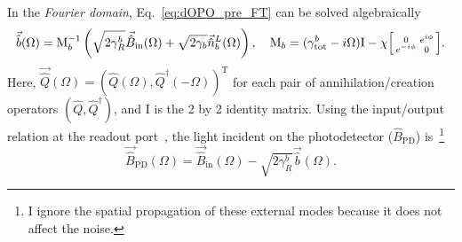 In the \emph{Fourier domain}, Eq.~\ref{eq:dOPO_pre_FT} can be solved algebraically~\cite{PhysRevA.30.1386} %
\begin{equation}
\label{eq:dOPO_FT_vectorised}
\vec{\hat b}(\Omega)=\text{M}_b^{-1}\left(\sqrt{2\gamma^b_R}\vec{\hat{B}}_\mathrm{in}(\Omega) + \sqrt{2\gamma_b}\vec{\hat{n}}^L_b(\Omega)\right),\quad\text{M}_b=(\gamma^b_\mathrm{tot}-i \Omega)\text{I}-\chi \begin{bsmallmatrix}0 & e^{i\phi} \\e^{-i\phi} & 0\end{bsmallmatrix}.
\end{equation}
Here, $\vec{\hat{Q}}(\Omega)=(\hat{Q}(\Omega),\hat{Q}^\dag(-\Omega))^\text{T}$ for each pair of annihilation/creation operators $(\hat Q, \hat Q^\dag)$, and $\text{I}$ is the 2 by 2 identity matrix.
Using the input/output relation at the readout port~\cite{PhysRevA.31.3761}, %
the light incident on the photodetector ($\hat B_\text{PD}$) is~\footnote{I ignore the spatial propagation of these external modes because it does not affect the noise.}
\begin{equation}
\label{eq:dOPO_IO}\vec{\hat{B}}_\mathrm{PD}(\Omega)=\vec{\hat{B}}_\mathrm{in}(\Omega)-\sqrt{2\gamma^b_R}\vec{\hat b}(\Omega).
\end{equation} 

